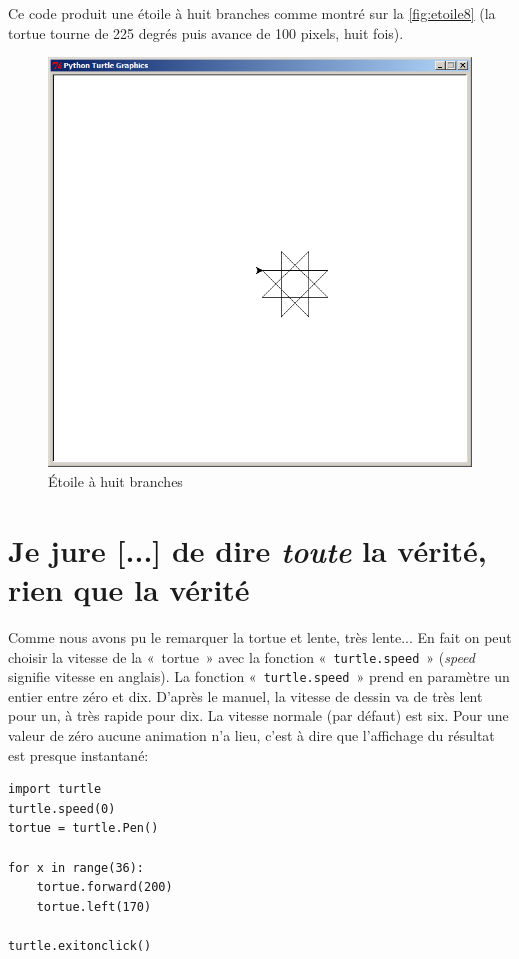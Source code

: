 Ce code produit une étoile à huit branches comme montré sur la \autoref{fig:etoile8} (la tortue tourne de 225 degrés puis avance de 100 pixels, huit fois).
\begin{figure}[h!]
\centering
\includegraphics[scale=0.4]{images/etoile8}
\caption{Étoile à huit branches}\label{fig:etoile8}
\end{figure}


\section{Je jure [...] de dire \emph{toute} la vérité, rien que la vérité}

Comme nous avons pu le remarquer la tortue et lente, très lente... En fait on peut choisir la vitesse de la « tortue » avec la fonction « \texttt{turtle.speed} » (\emph{speed} signifie vitesse en anglais). La fonction « \texttt{turtle.speed} » prend en paramètre un entier entre zéro et dix. D'après le manuel, la vitesse de dessin va de très lent pour un, à très rapide pour dix. La vitesse normale (par défaut) est six. Pour une valeur de zéro aucune animation n'a lieu, c'est à dire que l'affichage du résultat est presque instantané:

\begin{Verbatim}[frame=single,rulecolor=\color{mbleu}, label=à taper]
import turtle
turtle.speed(0)
tortue = turtle.Pen()

for x in range(36):
    tortue.forward(200)
    tortue.left(170)
    
turtle.exitonclick()
\end{Verbatim}

